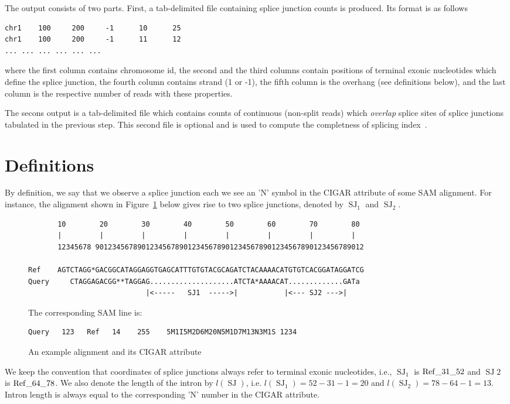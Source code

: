 \documentclass{article}
\DeclareMathOperator{\SJ}{SJ}
\begin{document}
The output consists of two parts. First, a tab-delimited file containing splice junction counts is produced.
Its format is as follows
\begin{verbatim}
chr1    100     200     -1      10      25
chr1    100     200     -1      11      12
...	...	...	...	...	...
\end{verbatim}
where the first column contains chromosome id, the second and the third columns contain positions of terminal exonic 
nucleotides which define the splice junction, the fourth column contains strand (1 or -1), the fifth column is the 
overhang (see definitions below), and the last column is the respective number of reads with these properties.

The secons output is a tab-delimited  file  which contains counts of continuous (non-split reads) which {\em overlap}
splice sites of splice junctions tabulated in the previous step. This second file is optional and is used to compute 
the completness of splicing index~\cite{pmid23172860, pmid22955974}.

\section{Definitions}

By definition, we say that we observe a splice junction each we see an 'N' symbol in the CIGAR attribute of some
SAM alignment. For instance, the alignment shown in Figure~\ref{fig::01} below gives rise to two splice junctions, 
denoted by $\SJ_1$ and $\SJ_2$.
%
\begin{figure}[h]
\footnotesize
\begin{verbatim}
       10        20        30        40        50        60        70        80
       |         |         |         |         |         |         |         |
       12345678 9012345678901234567890123456789012345678901234567890123456789012

Ref    AGTCTAGG*GACGGCATAGGAGGTGAGCATTTGTGTACGCAGATCTACAAAACATGTGTCACGGATAGGATCG
Query     CTAGGAGACGG**TAGGAG....................ATCTA*AAAACAT.............GATa
                            |<-----   SJ1  ----->|           |<--- SJ2 --->|
\end{verbatim}

The corresponding SAM line is:
\begin{verbatim}
Query   123   Ref   14    255    5M1I5M2D6M20N5M1D7M13N3M1S 1234 
\end{verbatim}
\caption{An example alignment and its CIGAR attribute\label{fig::01}}
\end{figure}
%
We keep the convention that coordinates of splice junctions always refer to terminal exonic nucleotides, 
i.e., $\SJ_1$ is $\rm Ref\_31\_52$ and $\SJ2$ is $\rm Ref\_64\_78$. We also denote the length of the 
intron by $l(\SJ)$, i.e. $l(\SJ_1)=52-31-1=20$ and $l(\SJ_2)=78-64-1=13$. Intron length is always equal 
to the corresponding 'N' number in the CIGAR attribute.
\end{document}
